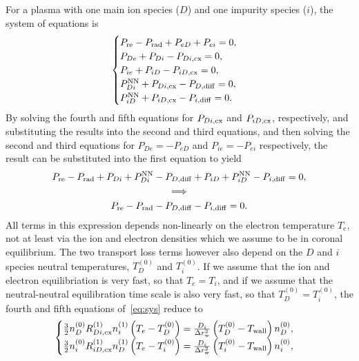 \documentclass{notes}
\begin{document}
	For a plasma with one main ion species ($D$) and one impurity species ($i$),
	the system of equations is
	\begin{equation}\label{eq:sys}
		\begin{cases}
			P_{\rm re} - P_{\rm rad} + P_{eD} + P_{ei} = 0,\\
			P_{De} + P_{Di} - P_{Di,{\rm cx}} = 0,\\
			P_{ie} + P_{iD} - P_{iD,{\rm cx}} = 0,\\
			P_{Di}^{\rm NN} + P_{Di,{\rm cx}} - P_{D,\rm diff} = 0,\\
			P_{iD}^{\rm NN} + P_{iD,{\rm cx}} - P_{i,\rm diff} = 0.
		\end{cases}
	\end{equation}
	By solving the fourth and fifth equations for $P_{Di,{\rm cx}}$ and
	$P_{iD,{\rm cx}}$, respectively, and substituting the results into the
	second and third equations, and then solving the second and third equations
	for $P_{De}=-P_{eD}$ and $P_{ie}=-P_{ei}$ respectively, the result can be
	substituted into the first equation to yield
	\begin{equation}
		\begin{gathered}
			P_{\rm re} - P_{\rm rad} + P_{Di} + P_{Di}^{\rm NN} - P_{D,\rm diff} +
			P_{iD} + P_{iD}^{\rm NN} - P_{i,\rm diff} = 0,\\
			\implies\\
			P_{\rm re} - P_{\rm rad} - P_{D,\rm diff} - P_{i,\rm diff} = 0.
		\end{gathered}
	\end{equation}
	All terms in this expression depends non-linearly on the electron
	temperature $T_e$, not at least via the ion and electron densities which
	we assume to be in coronal equilibrium. The two transport loss terms however
	also depend on the $D$ and $i$ species neutral temperatures, $T_D^{(0)}$ and
	$T_i^{(0)}$. If we assume that the ion and electron equilibriation is very
	fast, so that $T_e=T_i$, and if we assume that the neutral-neutral
	equilibration time scale is also very fast, so that $T_D^{(0)}=T_i^{(0)}$,
	the fourth and fifth equations of~\eqref{eq:sys} reduce to
	\begin{equation}
		\begin{cases}
			\frac{3}{2}n_D^{(0)} R_{Di,\rm cx}^{(1)}n_i^{(1)}
				\left(T_e-T_D^{(0)}\right) =
			\frac{D_i}{\Delta r_{\rm w}^2}\left(T_D^{(0)}-T_{\rm wall}\right)n_D^{(0)},\\
			\frac{3}{2}n_i^{(0)} R_{iD,\rm cx}^{(1)}n_D^{(1)}
				\left(T_e-T_i^{(0)}\right) =
			\frac{D_i}{\Delta r_{\rm w}^2}\left(T_i^{(0)}-T_{\rm wall}\right)n_i^{(0)},
		\end{cases}
	\end{equation}
\end{document}
